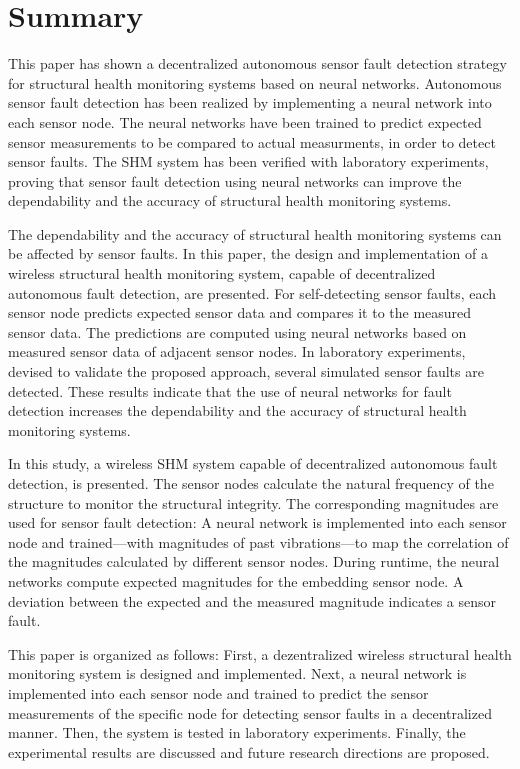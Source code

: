 \documentclass[12pt,a4paper]{scrartcl}
\begin{document}

\section*{Summary}

This paper has shown a decentralized autonomous sensor fault detection strategy for structural health monitoring systems based on neural networks. 
Autonomous sensor fault detection has been realized by implementing a neural network into each sensor node.
The neural networks have been trained to predict expected sensor measurements to be compared to actual measurments, in order to detect sensor faults.
The SHM system has been verified with laboratory experiments, proving that sensor fault detection using neural networks can improve the dependability and the accuracy of structural health monitoring systems.





The dependability and the accuracy of structural health moni\-toring systems can be affected by sensor faults. 
In this paper, the design and implementation of a wireless structural health monitoring system, capable of decentralized autonomous fault detection, are presented. 
For self-detecting sensor faults, each sensor node predicts expected sensor data and compares it to the measured sensor data. 
The predictions are computed using neural networks based on measured sensor data of adjacent sensor nodes.
In laboratory experiments, devised to validate the proposed approach, several simulated sensor faults are detected.
These results indicate that the use of neural networks for fault detection increases the dependability and the accuracy of structural health monitoring systems.

In this study, a wireless SHM system capable of decentralized autonomous fault detection, is presented.
The sensor nodes calculate the natural frequency of the structure to monitor the structural integrity.
The corresponding magnitudes are used for sensor fault detection:
A neural network is implemented into each sensor node and trained---with magnitudes of past vibrations---to map the correlation of the magnitudes calculated by different sensor nodes.
During runtime, the neural networks compute expected magnitudes for the embedding sensor node.
A deviation between the expected and the measured magnitude indicates a sensor fault.

This paper is organized as follows:
First, a dezentralized wireless structural health monitoring system is designed and implemented. 
Next, a neural network is implemented into each sensor node and trained to predict the sensor measurements of the specific node for detecting sensor faults in a decentralized manner. 
Then, the system is tested in laboratory experiments. 
Finally, the experimental results are discussed and future research directions are proposed.




\end{document}
